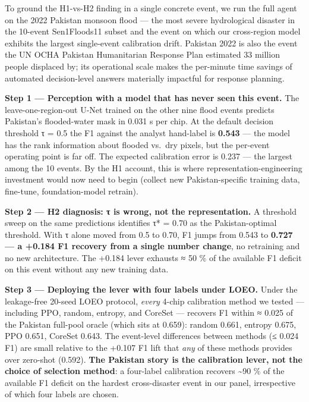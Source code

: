 To ground the H1-vs-H2 finding in a single concrete event, we run the
full agent on the 2022 Pakistan monsoon flood --- the most severe
hydrological disaster in the 10-event Sen1Floods11 subset and the event
on which our cross-region model exhibits the largest single-event
calibration drift. Pakistan 2022 is also the event the UN OCHA Pakistan
Humanitarian Response Plan estimated 33 million people displaced by;
its operational scale makes the per-minute time savings of automated
decision-level answers materially impactful for response planning.

\textbf{Step 1 --- Perception with a model that has never seen this event.}
The leave-one-region-out U-Net trained on the other nine flood events
predicts Pakistan's flooded-water mask in 0.031 s per chip. At the
default decision threshold τ = 0.5 the F1 against the analyst hand-label
is \textbf{0.543} --- the model has the rank information about flooded vs.~dry
pixels, but the per-event operating point is far off. The expected
calibration error is 0.237 --- the largest among the 10 events. By the H1
account, this is where representation-engineering investment would now
need to begin (collect new Pakistan-specific training data, fine-tune,
foundation-model retrain).

\textbf{Step 2 --- H2 diagnosis: τ is wrong, not the representation.} A
threshold sweep on the same predictions identifies τ* = 0.70 as the
Pakistan-optimal threshold. With τ alone moved from 0.5 to 0.70, F1
jumps from 0.543 to \textbf{0.727 --- a +0.184 F1 recovery from a single number
change}, no retraining and no new architecture. The +0.184 lever
exhausts ≈ 50 \% of the available F1 deficit on this event without any
new training data.

\textbf{Step 3 --- Deploying the lever with four labels under LOEO.} Under the
leakage-free 20-seed LOEO protocol, \emph{every} 4-chip calibration method
we tested --- including PPO, random, entropy, and CoreSet --- recovers F1
within ≈ 0.025 of the Pakistan full-pool oracle (which sits at 0.659):
random 0.661, entropy 0.675, PPO 0.651, CoreSet 0.643. The
event-level differences between methods (≤ 0.024 F1) are small relative
to the +0.107 F1 lift that \emph{any} of these methods provides over
zero-shot (0.592). \textbf{The Pakistan story is the calibration lever, not
the choice of selection method}: a four-label calibration recovers
\textasciitilde90 \% of the available F1 deficit on the hardest cross-disaster event
in our panel, irrespective of which four labels are chosen.

